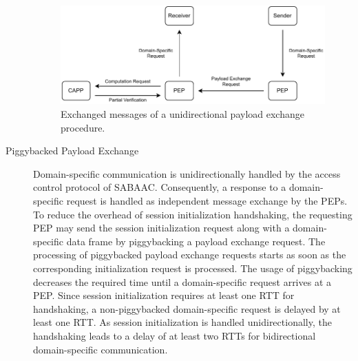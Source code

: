 \begin{description}
\begin{figure}
        \includegraphics[width=1.0\linewidth]{figures/SABAAC_protocols_accesscontrol_payloadexchange.drawio.pdf}
        \caption{Exchanged messages of a unidirectional payload exchange procedure.
        }
        \label{fig:sabaac_accesscontrol_payloadexchange}
    \end{figure}
    
    \item[Piggybacked Payload Exchange] Domain-specific communication is unidirectionally handled by the access control protocol of SABAAC.
    Consequently, a response to a domain-specific request is handled as independent message exchange by the PEPs.
    To reduce the overhead of session initialization handshaking, the requesting PEP may send the session initialization request along with a domain-specific data frame by piggybacking a payload exchange request.
    The processing of piggybacked payload exchange requests starts as soon as the corresponding initialization request is processed.
    The usage of piggybacking decreases the required time until a domain-specific request arrives at a PEP.
    Since session initialization requires at least one RTT for handshaking, a non-piggybacked domain-specific request is delayed by at least one RTT.
    As session initialization is handled unidirectionally, the handshaking leads to a delay of at least two RTTs for bidirectional domain-specific communication.


\end{description}
